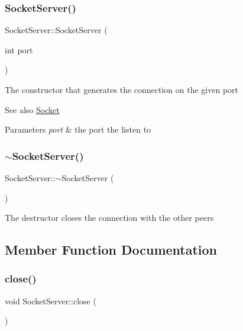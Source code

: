 \subsubsection{\texorpdfstring{Socket\+Server()}{SocketServer()}}
{\footnotesize\ttfamily Socket\+Server\+::\+Socket\+Server (\begin{DoxyParamCaption}\item[{int}]{port }\end{DoxyParamCaption})\hspace{0.3cm}{\ttfamily [explicit]}}

The constructor that generates the connection on the given port \begin{DoxySeeAlso}{See also}
\mbox{\hyperlink{classSocket}{Socket}}
\end{DoxySeeAlso}

\begin{DoxyParams}{Parameters}
{\em port} & the port the listen to \\
\hline
\end{DoxyParams}
\mbox{\label{classSocketServer_af0e595690e453ef4b8e8da174069aba9}} 
\subsubsection{\texorpdfstring{$\sim$\+Socket\+Server()}{~SocketServer()}}
{\footnotesize\ttfamily Socket\+Server\+::$\sim$\+Socket\+Server (\begin{DoxyParamCaption}{ }\end{DoxyParamCaption})}

The destructor closes the connection with the other peers 

\subsection{Member Function Documentation}
\mbox{\label{classSocketServer_a1e673e526a459bdb3ca92e103ec212ae}} 
\subsubsection{\texorpdfstring{close()}{close()}}
{\footnotesize\ttfamily void Socket\+Server\+::close (\begin{DoxyParamCaption}{ }\end{DoxyParamCaption})}

